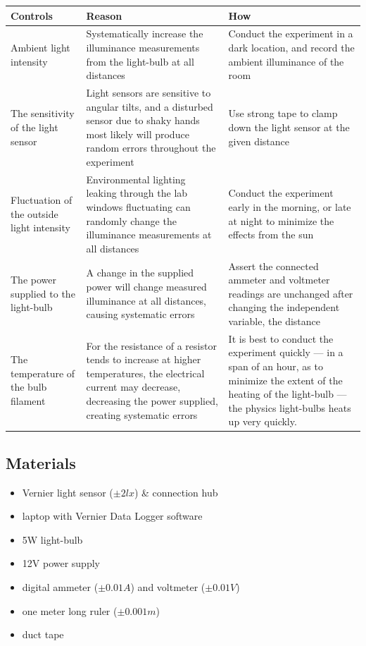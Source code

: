 \documentclass[a4paper,12pt]{article}
\begin{document}
\begin{longtable}{P{0.2\textwidth}|P{0.35\textwidth}|P{0.35\textwidth}}
Controls & Reason & How\\\hline
Ambient light intensity & Systematically increase the illuminance measurements from the light-bulb at all distances & Conduct the experiment in a dark location, and record the ambient illuminance of the room \\

The sensitivity of the light sensor & Light sensors are sensitive to angular tilts, and a disturbed sensor due to shaky hands most likely will produce random errors throughout the experiment & Use strong tape to clamp down the light sensor at the given distance\\

Fluctuation of the outside light intensity & Environmental lighting leaking through the lab windows fluctuating can randomly change the illuminance measurements at all distances & Conduct the experiment early in the morning, or late at night to minimize the effects from the sun \\

The power supplied to the light-bulb & A change in the supplied power will change measured illuminance at all distances, causing systematic errors & Assert the connected ammeter and voltmeter readings are unchanged after changing the independent variable, the distance\\

The temperature of the bulb filament & For the resistance of a resistor tends to increase at higher temperatures, the electrical current may decrease, decreasing the power supplied, creating systematic errors & It is best to conduct the experiment quickly --- in a span of an hour, as to minimize the extent of the heating of the light-bulb --- the physics light-bulbs heats up very quickly.

\end{longtable}

\newpage

\subsection{Materials}
\begin{itemize}
 \item Vernier light sensor ($\pm 2\si{lx}$) \parencite{vernier_manual} \& connection hub
 \item laptop with Vernier Data Logger software
 \item 5W light-bulb
 \item 12V power supply
 \item digital ammeter ($\pm 0.01\si{A}$) and voltmeter ($\pm 0.01\si{V}$)
 \item one meter long ruler ($\pm 0.001\si{m}$)
 \item duct tape
 \end{itemize}
\end{document}
